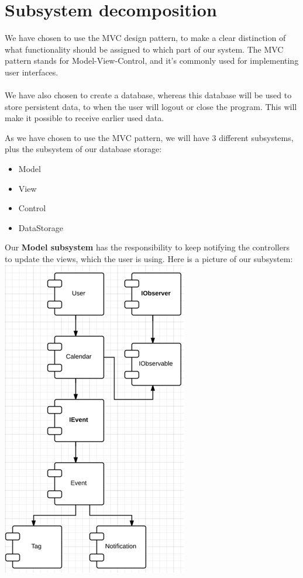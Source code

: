 \section{Subsystem decomposition}

We have chosen to use the MVC design pattern, to make a clear distinction of what functionality 
should be assigned to which part of our system. The MVC pattern stands for Model-View-Control, 
and it’s commonly used for implementing user interfaces.
\\\\
We have also chosen to create a database, whereas this database will be used to store persistent data, to when the user will logout or close the program. This will make it possible to receive earlier used data.

As we have chosen to use the MVC pattern, we will have 3 different subsystems, plus the subsystem of our database storage:

\begin{itemize}
	\item Model
	\item View
	\item Control
	\item DataStorage
\end{itemize}

Our \textbf{Model subsystem} has the responsibility to keep notifying the controllers to update the views, which the user is using. Here is a picture of our subsystem:\\
\includegraphics[scale=0.8]{modelSubsystem}

